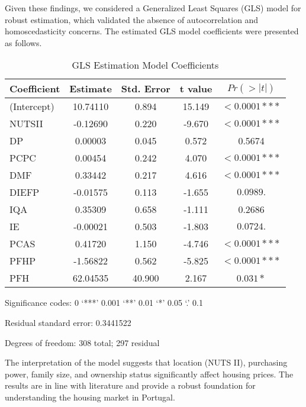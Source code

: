 \documentclass{aip-cp}
\begin{document}
Given these findings, we considered a Generalized Least Squares (GLS) model for robust estimation, which validated the absence of autocorrelation and homoscedasticity concerns. The estimated GLS model coefficients were presented as follows.

\begin{table}[!ht]
\centering
\begin{threeparttable}
\begin{tabular}{lcccc}
\hline
\textbf{Coefficient} & \textbf{Estimate} & \textbf{Std. Error} & \textbf{t value} & \textbf{$Pr(>|t|)$} \\
\hline
(Intercept) & 10.74110 & 0.894 & 15.149 & $< 0.0001 ***$ \\
NUTSII & -0.12690 & 0.220 & -9.670 & $< 0.0001 ***$ \\
DP & 0.00003 & 0.045 & 0.572 & 0.5674 \\
PCPC & 0.00454 & 0.242 & 4.070 & $< 0.0001 ***$ \\
DMF & 0.33442 & 0.217 & 4.616 & $< 0.0001 ***$ \\
DIEFP & -0.01575 & 0.113 & -1.655 & $0.0989 .$ \\
IQA & 0.35309 & 0.658 & -1.111 & 0.2686 \\
IE & -0.00021 & 0.503 & -1.803 & $0.0724 .$ \\
PCAS & 0.41720 & 1.150 & -4.746 & $< 0.0001 ***$ \\
PFHP & -1.56822 & 0.562 & -5.825 & $< 0.0001 ***$ \\
PFH & 62.04535 & 40.900 & 2.167 & $0.031 *$ \\
\hline
\end{tabular}
\caption{GLS Estimation Model Coefficients}
\label{tab:gls_model}
\begin{tablenotes}
\small
\item Significance codes: 0 ‘***’ 0.001 ‘**’ 0.01 ‘*’ 0.05 ‘.’ 0.1
\item Residual standard error: 0.3441522
\item Degrees of freedom: 308 total; 297 residual
\end{tablenotes}
\end{threeparttable}
\end{table}



The interpretation of the model suggests that location (NUTS II), purchasing power, family size, and ownership status significantly affect housing prices. The results are in line with literature and provide a robust foundation for understanding the housing market in Portugal.
\end{document}
